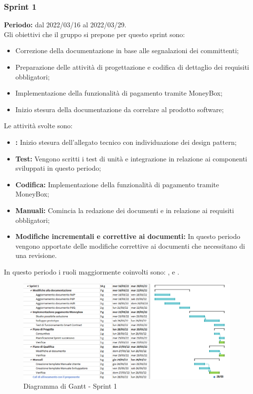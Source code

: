 \subsubsection{Sprint 1} \label{subsubsection:sprint_1}
\textbf{Periodo:} dal 2022/03/16 al 2022/03/29.
\bigskip
\\Gli obiettivi che il gruppo si prepone per questo sprint\glo{} sono:
\begin{itemize}
  \item Correzione della documentazione in base alle segnalazioni dei committenti;
  \item Preparazione delle attività di progettazione e codifica di dettaglio dei requisiti obbligatori;
  \item Implementazione della funzionalità di pagamento tramite MoneyBox\glo{};
  \item Inizio stesura della documentazione da correlare al prodotto software;
\end{itemize}
Le attività svolte sono:
\begin{itemize}
  \item \textbf{\PB{}:} Inizio stesura dell’allegato tecnico con individuazione dei design pattern;
  \item \textbf{Test:} Vengono scritti i test di unità e integrazione in relazione ai componenti sviluppati in questo periodo;
  \item \textbf{Codifica:} Implementazione della funzionalità di pagamento tramite MoneyBox\glo{};
  \item \textbf{Manuali:} Comincia la redazione dei documenti \docNameVersionMU{} e \docNameVersionMS{} in relazione ai requisiti obbligatori;
  \item \textbf{Modifiche incrementali e correttive ai documenti:} In questo periodo vengono apportate delle modifiche correttive ai documenti che necessitano di una revisione.
\end{itemize}
In questo periodo i ruoli maggiormente coinvolti sono: \roleDesignerLow{}, \roleProgrammerLow{} e \roleVerifierLow{}.
\bigskip
\begin{figure}[H]
  \centering
  \includegraphics[scale=0.52]{immagini/1sprint.png}
  \caption{Diagramma di Gantt - Sprint 1}
\end{figure}

